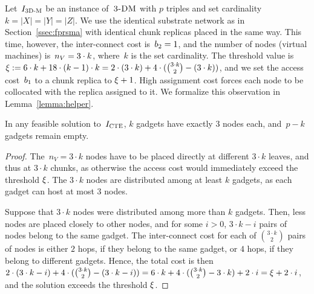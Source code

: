 Let~$I_{\mathrm{\textsc{3D-M}}}$ be an instance of~$\textsc{3-DM}$ with $p$ triples and set cardinality $k = |X| = |Y| = |Z|$.
We use the identical substrate network as in Section~\ref{ssec:fprsma} with
identical chunk replicas placed in the same way.
This time, however, the inter-connect cost is~$b_2 = 1$, and the number of nodes (virtual machines) is~$n_V = 3 \cdot k$, where~$k$ is the set cardinality.
The threshold value is $\xi := 6\cdot k + 18\cdot (k-1)\cdot k = 2\cdot (3\cdot k) + 4\cdot({ 3\cdot k \choose 2} - (3\cdot k))$, and we set the access cost~$b_1$ to a chunk replica to $\xi + 1$.
High assignment cost forces each node to be collocated with the replica assigned to it.
We formalize this observation in Lemma~\ref{lemma:helper}.
\begin{lemma}\label{lemma:helper}
In any feasible solution to~$I_{\mathrm{\textsc{CTE}}}$, $k$ gadgets have exactly
$3$ nodes each, and~$p-k$ gadgets remain empty.
\end{lemma}
\begin{proof}
The~$n_V = 3\cdot k$ nodes have to be placed
directly at different $3\cdot k$ leaves, and thus at $3\cdot k$ chunks, as otherwise the access cost would immediately exceed the threshold $\xi$.
The $3\cdot k$ nodes are distributed among at least $k$ gadgets, as each gadget can host at most $3$ nodes.

Suppose that $3\cdot k$ nodes were distributed among more than $k$ gadgets.
Then, less nodes are placed closely to other nodes, and for some $i>0$, $3\cdot k - i$ pairs of nodes belong to the same gadget.
The inter-connect cost
for each of ${3\cdot k \choose 2}$ pairs of nodes is either
$2$ hops, if they belong to the same gadget, or $4$ hops, if they belong
to different gadgets.
Hence, the total cost is then $2\cdot (3\cdot k - i) + 4 \cdot ({3 \cdot k \choose 2} - (3\cdot k - i)) = 6\cdot k + 4 \cdot ({3 \cdot k \choose 2} - 3\cdot k) + 2\cdot i = \xi + 2\cdot i$, and the solution exceeds the threshold $\xi$.
\end{proof}

